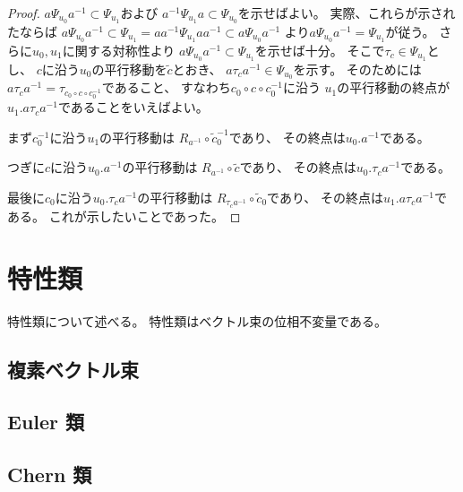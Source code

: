 \documentclass[report]{jlreq}
\begin{document}
\begin{proof}
    $a \Psi_{u_0} a^{-1} \subset \Psi_{u_1}$および
    $a^{-1} \Psi_{u_1} a \subset \Psi_{u_0}$を示せばよい。
    実際、これらが示されたならば
    $a \Psi_{u_0} a^{-1} \subset \Psi_{u_1}
    = aa^{-1} \Psi_{u_1} aa^{-1} \subset a \Psi_{u_0} a^{-1}$
    より$a \Psi_{u_0} a^{-1} = \Psi_{u_1}$が従う。
    さらに$u_0, u_1$に関する対称性より
    $a \Psi_{u_0} a^{-1} \subset \Psi_{u_1}$を示せば十分。
    そこで$\tau_c \in \Psi_{u_1}$とし、
    $c$に沿う$u_0$の平行移動を$\widetilde{c}$とおき、
    $a \tau_c a^{-1} \in \Psi_{u_0}$を示す。
    そのためには$a \tau_c a^{-1} = \tau_{c_0 \circ c \circ c_0^{-1}}$であること、
    すなわち$c_0 \circ c \circ c_0^{-1}$に沿う
    $u_1$の平行移動の終点が$u_1 . a \tau_c a^{-1}$であることをいえばよい。

    まず$c_0^{-1}$に沿う$u_1$の平行移動は
    $R_{a^{-1}} \circ \widetilde{c}_0^{-1}$であり、
    その終点は$u_0 . a^{-1}$である。

    つぎに$c$に沿う$u_0 . a^{-1}$の平行移動は
    $R_{a^{-1}} \circ \widetilde{c}$であり、
    その終点は$u_0 . \tau_c a^{-1}$である。

    最後に$c_0$に沿う$u_0 . \tau_c a^{-1}$の平行移動は
    $R_{\tau_c a^{-1}} \circ \widetilde{c}_0$であり、
    その終点は$u_1 . a \tau_c a^{-1}$である。
    これが示したいことであった。
\end{proof}






%
\chapter{特性類}

特性類について述べる。
特性類はベクトル束の位相不変量である。

%
\section{複素ベクトル束}

\begin{definition}
    \TODO{}
\end{definition}

%
\section{Euler 類}

\TODO{}

%
\section{Chern 類}

\TODO{}
\end{document}
